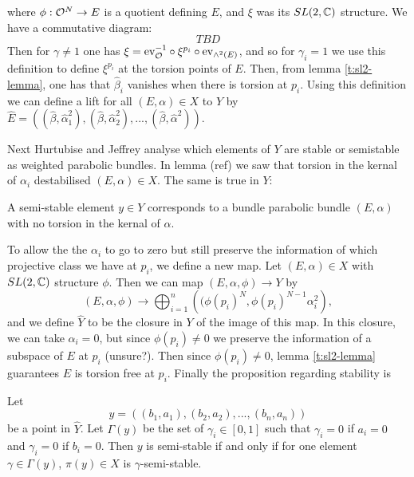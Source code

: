 	where $\phi:\mathcal{O}^N \to E$ is a quotient defining $E$, and $\xi$ was its $SL(2,\mathbb{C})$ structure. We have a commutative diagram:
	\begin{equation}
		TBD
	\end{equation}
	Then for $\gamma \neq 1$ one has $\xi = \text{ev}_{\mathcal{O}}^{-1}\circ \xi^{p_i} \circ \text{ev}_{\wedge^2(E)}$, and so for $\gamma_i=1$ we use this definition to define $\xi^{p_i}$ at the torsion points of $E$. Then, from lemma \ref{t:sl2-lemma}, one has that $\hat{\beta}_i$ vanishes when there is torsion at $p_i$. Using this definition we can define a lift for all $(E,\alpha)\in X$ to $Y$ by $
	\hat{E} = \left(
	(\hat{\beta}, \hat{\alpha}_1^2),(\hat{\beta},\hat{\alpha}_2^2),...,(\hat{\beta},\hat{\alpha}^2)
	\right).$
	
	Next Hurtubise and Jeffrey analyse which elements of $Y$ are stable or semistable as weighted parabolic bundles. In lemma (ref) we saw that torsion in the kernal of $\alpha_i$ destabilised $(E,\alpha) \in X$. The same is true in $Y$:
	\begin{lemma}[H\&J Lemma 4.13]
		A semi-stable element $y\in Y$ corresponds to a bundle parabolic bundle $(E,\alpha)$ with no torsion in the kernal of $\alpha$.
	\end{lemma}
	To allow the the $\alpha_i$ to go to zero but still preserve the information of which projective class we have at $p_i$, we define a new map. Let $(E,\alpha)\in X$ with $SL(2,\mathbb{C})$ structure $\phi$. Then we can map $(E,\alpha,\phi)\to Y$ by
	\begin{equation}
		(E,\alpha,\phi) \to \bigoplus_{i=1}^n\left(
		(\phi(p_i)^N, \phi(p_i)^{N-1}\alpha_i^2
		\right),
	\end{equation}
	and we define $\hat{Y}$ to be the closure in $Y$ of the image of this map. In this closure, we can take $\alpha_i =0$, but since $\phi(p_i)\neq 0$ we preserve the information of a subspace of $E$ at $p_i$ (unsure?). Then since $\phi(p_i)\neq 0$, lemma \ref{t:sl2-lemma} guarantees $E$ is torsion free at $p_i$. Finally the proposition regarding stability is
	\begin{theorem}[H\&J Prop 4.14]
		Let 
		\begin{equation}
			y = \left(
			(b_1, a_1), (b_2, a_2),...,(b_n, a_n)
			\right)
		\end{equation}
		be a point in $\hat{Y}$. Let $\Gamma(y)$ be the set of $\gamma_i \in [0,1]$ such that $\gamma_i =0$ if $a_i =0$ and $\gamma_i = 0$ if $b_i = 0$. Then $y$ is semi-stable if and only if for one element $\gamma \in \Gamma(y)$, $\pi(y)\in X$ is $\gamma$-semi-stable.
	\end{theorem}
